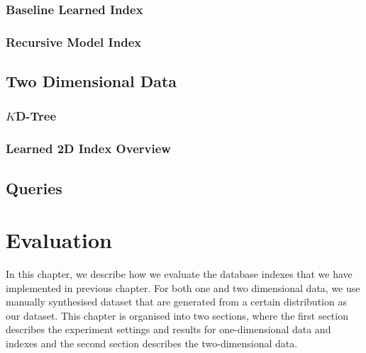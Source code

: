 \documentclass[a4paper,12pt]{scrreprt}
\newenvironment{mscsummary}{\fbox{Summary}}{\medskip}
\begin{document}


\subsection{Baseline Learned Index}



\subsection{Recursive Model Index}



\section{Two Dimensional Data}

\subsection{$K$D-Tree}



\subsection{Learned 2D Index Overview}



\section{Queries}



\chapter{Evaluation}

\begin{mscsummary}
	In this chapter, we describe how we evaluate the database indexes that we have implemented in previous chapter. For both one and two dimensional data, we use manually synthesised dataset that are generated from a certain distribution as our dataset. This chapter is organised into two sections, where the first section describes the experiment settings and results for one-dimensional data and indexes and the second section describes the two-dimensional data.
\end{mscsummary}
\end{document}
